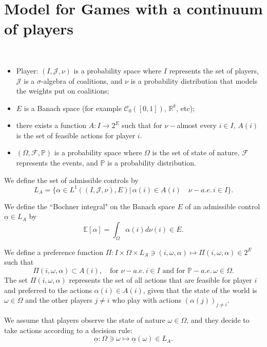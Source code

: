 \section{Model for Games with a continuum of players}

\begin{definition}\ 
	\begin{itemize}
		\item Player: $(I, \mathcal{J}, \nu)$ is a probability space where $I$ represents the set of players, $\mathcal{J}$ is a $\sigma$-algebra of coalitions, and $\nu$ is a probability distribution that models the weights put on coalitions;
		\item $E$ is a Banach space (for example $\mathcal{C}_0([0,1])$, $\mathbb{R}^k$, etc);
		\item there exists a function $A: I \to 2^E$ such that for $\nu-$almost every $i \in I$, $A(i)$ is the set of feasible actions for player $i$.
		\item $(\Omega, \mathcal{F}, \mathbb{P})$ is a probability space where $\Omega$ is the set of state of nature, $\mathcal{F}$ represents the events, and $\mathbb{P}$ is a probability distribution.
	\end{itemize}
\end{definition}

We define the set of admissible controls by 
$$
	L_A = \{\alpha\in L^1( (I, \mathcal{J},\nu), E) | \, \alpha(i) \in A(i) \quad \nu-a.e. \, i\in I \}.
$$

We define the ``Bochner integral" on the Banach space $E$ of an admissible control $\underline{\alpha} \in L_A$ by
$$
	\mathbb{E}[\alpha] = \int_{\Omega} \alpha(i) d\nu(i)  \in E.
$$

\begin{definition}
We define a preference function $\Pi : I \times \Omega \times L_A \ni (i, \omega, \alpha) \mapsto \Pi(i,\omega, \alpha) \in 2^E$ such that
$$
	\Pi(i,\omega, \alpha) \subset A(i),\quad \text{for } \nu-a.e.\, i\in I \text{ and for } \mathbb{P}-a.e. \, \omega \in \Omega.
$$	
The set $\Pi(i,\omega, \alpha)$ represents the set of all actions that are feasible for player $i$ and preferred to the actions $\alpha(i) \in A(i)$, given that the state of the world is $\omega \in \Omega$ and the other players $j \neq i$ who play with actions $(\alpha(j))_{j\neq i}$.
\end{definition}

We assume that players observe the state of nature $\omega \in \Omega$, and they decide to take actions according to a decision rule:
$$
\underline{\alpha} : \Omega \ni \omega \mapsto \underline{\alpha}(\omega) \in L_A.
$$


